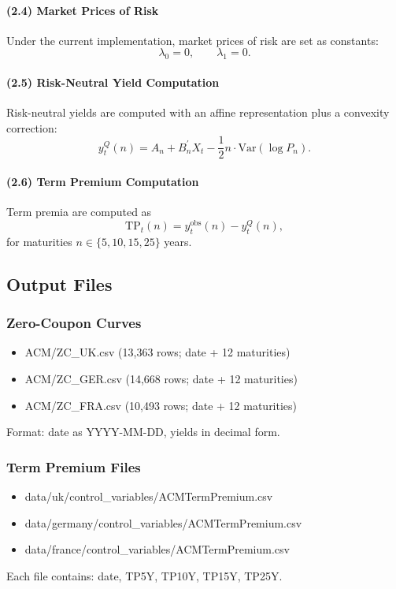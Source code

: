 \paragraph{(2.4) Market Prices of Risk}
Under the current implementation, market prices of risk are set as constants:
\begin{equation}
\lambda_0 = 0, \qquad \lambda_1 = 0.
\end{equation}

\paragraph{(2.5) Risk-Neutral Yield Computation}
Risk-neutral yields are computed with an affine representation plus a convexity correction:
\begin{equation}
y_t^{Q}(n) = A_n + B_n^\prime X_t - \frac{1}{2} n \cdot \mathrm{Var}(\log P_n).
\end{equation}

\paragraph{(2.6) Term Premium Computation}
Term premia are computed as
\begin{equation}
\mathrm{TP}_t(n) = y_t^{\mathrm{obs}}(n) - y_t^{Q}(n),
\end{equation}
for maturities $n \in \{5,10,15,25\}$ years.

\subsection{Output Files}

\subsubsection{Zero-Coupon Curves}
\begin{itemize}
  \item ACM/ZC\_UK.csv (13,363 rows; date + 12 maturities)
  \item ACM/ZC\_GER.csv (14,668 rows; date + 12 maturities)
  \item ACM/ZC\_FRA.csv (10,493 rows; date + 12 maturities)
\end{itemize}
Format: date as YYYY-MM-DD, yields in decimal form.

\subsubsection{Term Premium Files}
\begin{itemize}
  \item data/uk/control\_variables/ACMTermPremium.csv
  \item data/germany/control\_variables/ACMTermPremium.csv
  \item data/france/control\_variables/ACMTermPremium.csv
\end{itemize}
Each file contains: date, TP5Y, TP10Y, TP15Y, TP25Y.

